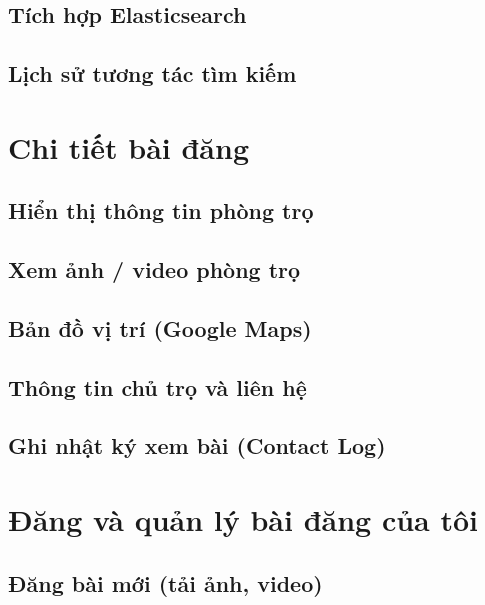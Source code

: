 \subsection{Tích hợp Elasticsearch}


\subsection{Lịch sử tương tác tìm kiếm}


\section{Chi tiết bài đăng}

\subsection{Hiển thị thông tin phòng trọ}


\subsection{Xem ảnh / video phòng trọ}


\subsection{Bản đồ vị trí (Google Maps)}


\subsection{Thông tin chủ trọ và liên hệ}


\subsection{Ghi nhật ký xem bài (Contact Log)}


\section{Đăng và quản lý bài đăng của tôi}

\subsection{Đăng bài mới (tải ảnh, video)}


